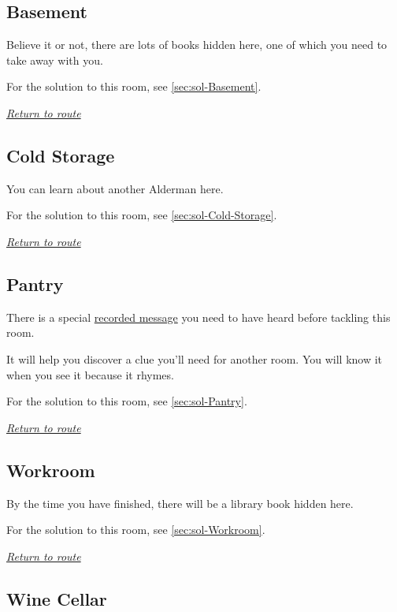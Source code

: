 \documentclass[a5paper]{extarticle}
\begin{document}
\newpage
\subsection{Basement}\label{sec:req-Basement}

Believe it or not, there are lots of books hidden here,
one of which you need to take away with you.

For the solution to this room, see \cref{sec:sol-Basement}.

\hyperref[sec:route-8]{\emph{Return to route}}

\newpage
\subsection{Cold Storage}\label{sec:req-Cold-Storage}

You can learn about another Alderman here.

For the solution to this room, see \cref{sec:sol-Cold-Storage}.

\hyperref[sec:route-8]{\emph{Return to route}}

\newpage
\subsection{Pantry}\label{sec:req-Pantry}

There is a special \hyperref[sec:nb-Church-Basement]{recorded message}
you need to have heard before tackling this room.

It will help you discover a clue you'll need for another room.
You will know it when you see it because it rhymes.

For the solution to this room, see \cref{sec:sol-Pantry}.

\hyperref[sec:route-8]{\emph{Return to route}}

\newpage
\subsection{Workroom}\label{sec:req-Workroom}

By the time you have finished, there will be a library book hidden here.

For the solution to this room, see \cref{sec:sol-Workroom}.

\hyperref[sec:route-8]{\emph{Return to route}}

\newpage
\subsection{Wine Cellar}\label{sec:req-Wine-Cellar}
\end{document}
